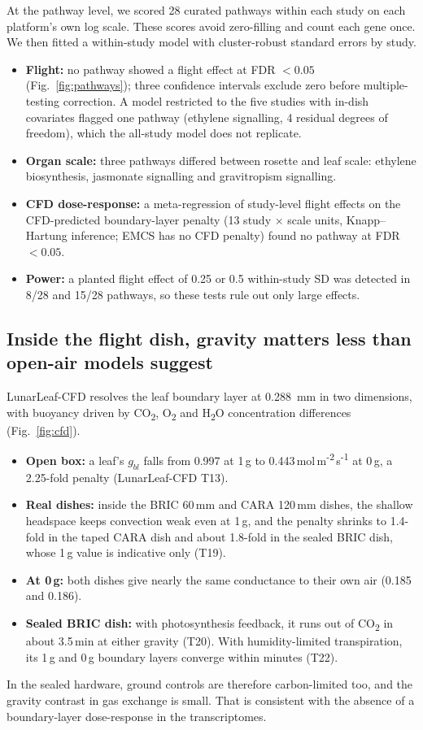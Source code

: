 \documentclass[11pt,a4paper]{article}
\begin{document}
At the pathway level, we scored 28 curated pathways within each study on each platform's own log scale. These scores avoid zero-filling and count each gene once. We then fitted a within-study model with cluster-robust standard errors by study.
\begin{itemize}
    \item \textbf{Flight:} no pathway showed a flight effect at FDR $< 0.05$ (Fig.~\ref{fig:pathways}); three confidence intervals exclude zero before multiple-testing correction. A model restricted to the five studies with in-dish covariates flagged one pathway (ethylene signalling, 4 residual degrees of freedom), which the all-study model does not replicate.
    \item \textbf{Organ scale:} three pathways differed between rosette and leaf scale: ethylene biosynthesis, jasmonate signalling and gravitropism signalling.
    \item \textbf{CFD dose-response:} a meta-regression of study-level flight effects on the CFD-predicted boundary-layer penalty (13 study $\times$ scale units, Knapp--Hartung inference; EMCS has no CFD penalty) found no pathway at FDR $< 0.05$.
    \item \textbf{Power:} a planted flight effect of 0.25 or 0.5 within-study SD was detected in 8/28 and 15/28 pathways, so these tests rule out only large effects.
\end{itemize}

\subsection*{Inside the flight dish, gravity matters less than open-air models suggest}

LunarLeaf-CFD resolves the leaf boundary layer at 0.288~mm in two dimensions, with buoyancy driven by CO\textsubscript{2}, O\textsubscript{2} and H\textsubscript{2}O concentration differences (Fig.~\ref{fig:cfd}).
\begin{itemize}
    \item \textbf{Open box:} a leaf's $g_{bl}$ falls from 0.997 at 1\,g to 0.443\,mol\,m\textsuperscript{-2}\,s\textsuperscript{-1} at 0\,g, a 2.25-fold penalty (LunarLeaf-CFD T13).
    \item \textbf{Real dishes:} inside the BRIC 60\,mm and CARA 120\,mm dishes, the shallow headspace keeps convection weak even at 1\,g, and the penalty shrinks to 1.4-fold in the taped CARA dish and about 1.8-fold in the sealed BRIC dish, whose 1\,g value is indicative only (T19).
    \item \textbf{At 0\,g:} both dishes give nearly the same conductance to their own air (0.185 and 0.186).
    \item \textbf{Sealed BRIC dish:} with photosynthesis feedback, it runs out of CO\textsubscript{2} in about 3.5\,min at either gravity (T20). With humidity-limited transpiration, its 1\,g and 0\,g boundary layers converge within minutes (T22).
\end{itemize}
In the sealed hardware, ground controls are therefore carbon-limited too, and the gravity contrast in gas exchange is small. That is consistent with the absence of a boundary-layer dose-response in the transcriptomes.
\end{document}
